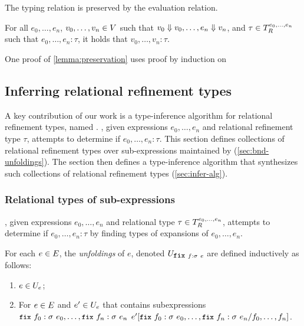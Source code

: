 The typing relation is preserved by the evaluation relation.
%
\begin{lemma}
  \label{lemma:preservation}
  For all $e_0, \ldots, e_n$, $v_0, \ldots, v_n \in V$ such that
  $v_0 \Downarrow v_0, \ldots, e_n \Downarrow v_n$, and
  $\tau \in T_{R}^{e_0, \ldots, e_n}$ such that
  $e_0, \ldots, e_n : \tau$, it holds that $v_0, \ldots, v_n : \tau$.
\end{lemma}
%
One proof of \autoref{lemma:preservation} uses proof by induction on
%

\subsection{Inferring relational refinement types}
\label{sec:infer}
%
A key contribution of our work is a type-inference algorithm for
relational refinement types, named \sys.
%
\sys, given expressions $e_0, \ldots, e_n$ and relational refinement
type $\tau$, attempts to determine if $e_0, \ldots, e_n : \tau$.
%
This section defines collections of relational refinement types over
sub-expressions maintained by \sys (\autoref{sec:bnd-unfoldings}).
%
The section then defines a type-inference algorithm that synthesizes
such collections of relational refinement types
(\autoref{sec:infer-alg}).

\subsubsection{Relational types of sub-expressions}
\label{sec:bnd-unfoldings}
%
\sys, given expressions $e_0, \ldots, e_n$ and relational type
$\tau \in T_{R}^{e_0, \ldots, e_n}$, attempts to determine if
$e_0, \ldots, e_n : \tau$ by finding types of expansions of
$e_0, \ldots, e_n$.
%
\begin{defn}
  \label{defn:unfoldings}
  For each $e \in E$, the \emph{unfoldings} of $e$, denoted
  $\unfoldings{ \fix{f}{\sigma}{e} }$ are defined inductively as follows:
  \begin{enumerate}
  \item %
    $e \in U_{ e }$;
  \item %
    For $e \in E$ and $e' \in U_{e}$ that contains
    subexpressions
    $\fix{f_0}{\sigma}{e_0}, \ldots, \fix{f_n}{\sigma}{e_n}$
    $\replace{e'}{f_0, \ldots, f_n}{ \fix{f_0}{\sigma}{e_0}, \ldots,
      \fix{f_n}{\sigma}{e_n} }$.
  \end{enumerate}
\end{defn}
%

